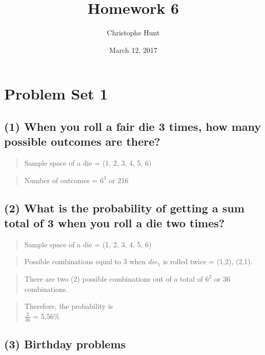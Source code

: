 \documentclass[]{article}
\title{Homework 6}
\author{Christophe Hunt}
\date{March 12, 2017}
\begin{document}
\maketitle

{
\setcounter{tocdepth}{2}
\tableofcontents
}
\section{Problem Set 1}\label{problem-set-1}

\subsection{(1) When you roll a fair die 3 times, how many possible
outcomes are
there?}\label{when-you-roll-a-fair-die-3-times-how-many-possible-outcomes-are-there}

\begin{quote}
Sample space of a die = (1, 2, 3, 4, 5, 6)
\end{quote}

\begin{quote}
Number of outcomes = \(6^3\) or 216
\end{quote}

\subsection{(2) What is the probability of getting a sum total of 3 when
you roll a die two
times?}\label{what-is-the-probability-of-getting-a-sum-total-of-3-when-you-roll-a-die-two-times}

\begin{quote}
Sample space of a die = (1, 2, 3, 4, 5, 6)
\end{quote}

\begin{quote}
Possible combinations equal to 3 when \(die_1\) is rolled twice = (1,2),
(2,1).
\end{quote}

\begin{quote}
There are two (2) possible combinations out of a total of \(6^2\) or 36
combinations.
\end{quote}

\begin{quote}
Therefore, the probability is\\
\(\frac{2}{36}\) = 5.56\%
\end{quote}

\subsection{(3) Birthday problems}\label{birthday-problems}
\end{document}
